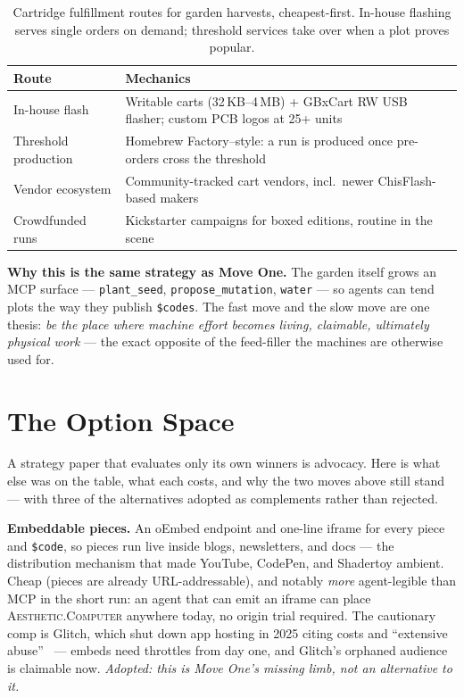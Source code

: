 \documentclass[10pt,letterpaper,twocolumn]{article}
\newcommand{\ac}{\textsc{Aesthetic.Computer}}
\begin{document}
\begin{table}[t]
\centering
\small
\begin{tabularx}{\columnwidth}{@{}l >{\raggedright\arraybackslash}X@{}}
\toprule
\textbf{Route} & \textbf{Mechanics} \\
\midrule
In-house flash & Writable carts (32\,KB--4\,MB) + GBxCart RW USB flasher; custom PCB logos at 25+ units~\citep{insidegadgets2026shop,adafruit2026flashing} \\
\addlinespace
Threshold production & Homebrew Factory--style: a run is produced once pre-orders cross the threshold~\citep{nintendodiff2026gb} \\
\addlinespace
Vendor ecosystem & Community-tracked cart vendors, incl.\ newer ChisFlash-based makers~\citep{bbbbbr2026vendors} \\
\addlinespace
Crowdfunded runs & Kickstarter campaigns for boxed editions, routine in the scene~\citep{gamerant2026stains} \\
\bottomrule
\end{tabularx}
\caption{Cartridge fulfillment routes for garden harvests, cheapest-first. In-house flashing serves single orders on demand; threshold services take over when a plot proves popular.}
\label{tab:carts}
\end{table}

\textbf{Why this is the same strategy as Move One.} The garden itself grows an MCP surface --- \texttt{plant\_seed}, \texttt{propose\_mutation}, \texttt{water} --- so agents can tend plots the way they publish \texttt{\$codes}. The fast move and the slow move are one thesis: \emph{be the place where machine effort becomes living, claimable, ultimately physical work} --- the exact opposite of the feed-filler the machines are otherwise used for.

\section{The Option Space}

A strategy paper that evaluates only its own winners is advocacy. Here is what else was on the table, what each costs, and why the two moves above still stand --- with three of the alternatives adopted as complements rather than rejected.

\textbf{Embeddable pieces.} An oEmbed endpoint and one-line iframe for every piece and \texttt{\$code}, so pieces run live inside blogs, newsletters, and docs --- the distribution mechanism that made YouTube, CodePen, and Shadertoy ambient. Cheap (pieces are already URL-addressable), and notably \emph{more} agent-legible than MCP in the short run: an agent that can emit an iframe can place \ac{} anywhere today, no origin trial required. The cautionary comp is Glitch, which shut down app hosting in 2025 citing costs and ``extensive abuse''~\citep{bleeping2025glitch} --- embeds need throttles from day one, and Glitch's orphaned audience is claimable now. \emph{Adopted: this is Move One's missing limb, not an alternative to it.}
\end{document}
